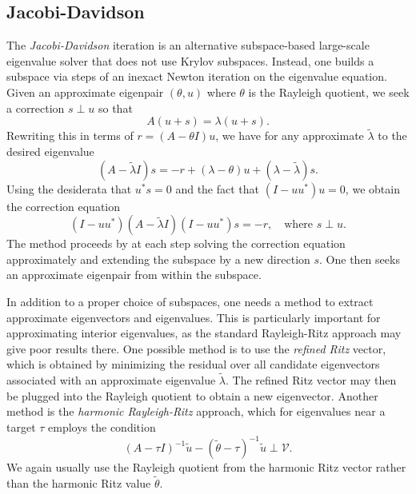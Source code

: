 \subsection{Jacobi-Davidson}

The {\em Jacobi-Davidson} iteration is an alternative subspace-based
large-scale eigenvalue solver that does not use Krylov subspaces.
Instead, one builds a subspace via steps of an inexact Newton iteration
on the eigenvalue equation.  Given an approximate eigenpair $(\theta,u)$
where $\theta$ is the Rayleigh quotient, we seek a correction $s \perp u$
so that
\[
  A(u+s) = \lambda (u+s).
\]
Rewriting this in terms of $r = (A-\theta I) u$, we have for any
approximate $\tilde{\lambda}$ to the desired eigenvalue
\[
  (A-\tilde{\lambda} I) s = -r + (\lambda-\theta) u + (\lambda-\tilde{\lambda}) s.
\]
Using the desiderata that $u^* s = 0$ and the fact that $(I-uu^*) u = 0$,
we obtain the correction equation
\[
  (I-uu^*) (A-\tilde{\lambda} I)(I-uu^*) s = -r, \quad \mbox{where } s \perp u.
\]
The method proceeds by at each step solving the correction equation
approximately and extending the subspace by a new direction $s$.
One then seeks an approximate eigenpair from within the subspace.

In addition to a proper choice of subspaces, one needs a method to
extract approximate eigenvectors and eigenvalues.  This is particularly
important for approximating interior eigenvalues, as the standard
Rayleigh-Ritz approach may give poor results there.  One possible
method is to use the {\em refined Ritz} vector, which is obtained by
minimizing the residual over all candidate eigenvectors associated
with an approximate eigenvalue $\tilde{\lambda}$.  The refined Ritz
vector may then be plugged into the Rayleigh quotient to obtain a
new eigenvector.  Another method is the {\em harmonic Rayleigh-Ritz}
approach, which for eigenvalues near a target $\tau$ employs the
condition
\[
  (A-\tau I)^{-1} \tilde{u} - (\tilde{\theta}-\tau)^{-1} \tilde{u} \perp \mathcal{V}.
\]
We again usually use the Rayleigh quotient from the harmonic Ritz vector
rather than the harmonic Ritz value $\tilde{\theta}$.
